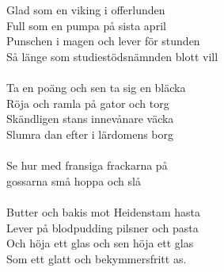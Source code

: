 \\
\vspace{10pt}\\
Glad som en viking i offerlunden\\
Full som en pumpa på sista april\\
Punschen i magen och lever för stunden\\
Så länge som studiestödsnämnden blott vill\\
\\
Ta en poäng och sen ta sig en bläcka\\
Röja och ramla på gator och torg\\
Skändligen stans innevånare väcka\\
Slumra dan efter i lärdomens borg\\
\\
Se hur med fransiga frackarna på\\
gossarna små hoppa och slå\\
\\
Butter och bakis mot Heidenstam hasta\\
Lever på blodpudding pilsner och pasta\\
Och höja ett glas och sen höja ett glas\\
Som ett glatt och bekymmersfritt as.
